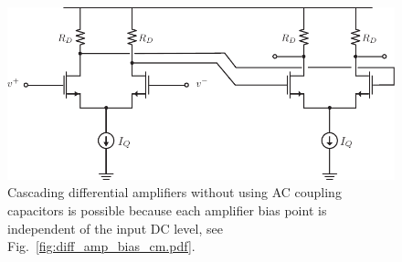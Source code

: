 \begin{figure}[tb]
\centering
\includegraphics[scale=.8]{Diff_Cascade.pdf}
\caption{Cascading differential amplifiers without using AC coupling capacitors is possible because each amplifier bias point is independent of the input DC level, see Fig.~\ref{fig:diff_amp_bias_cm.pdf}.}
\label{fig:diff_amp_cascade}
\end{figure}
